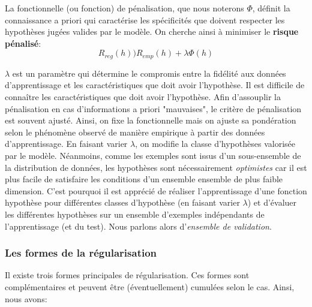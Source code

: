 \noindent La fonctionnelle (ou fonction) de pénalisation, que nous noterons $\Phi$, définit la connaissance a priori qui caractérise les spécificités que doivent respecter les hypothèses jugées valides par le modèle. On cherche ainsi à minimiser le \textbf{risque pénalisé}:
$$R_{reg}(h) ) R_{emp}(h) + \lambda \Phi(h)$$

\noindent $\lambda$ est un paramètre qui détermine le compromis entre la fidélité aux données d'apprentissage et les caractéristiques que doit avoir l'hypothèse. Il est difficile de connaître les caractéristiques que doit avoir l'hypothèse. Afin d'assouplir la pénalisation en cas d'informations a priori "mauvaises", le critère de pénalisation est souvent ajusté. Ainsi, on fixe la fonctionnelle mais on ajuste sa pondération selon le phénomène observé de manière empirique à partir des données d'apprentissage. En faisant varier $\lambda$, on modifie la classe d'hypothèses valorisée par le modèle. Néanmoins, comme les exemples sont issus d'un sous-ensemble de la distribution de données, les hypothèses sont nécessairement \textit{optimistes} car il est plus facile de satisfaire les conditions d'un ensemble ensemble de plus faible dimension. C'est pourquoi il est apprécié de réaliser l'apprentissage d'une fonction hypothèse pour différentes classes d'hypothèse (en faisant varier $\lambda$) et d'évaluer les différentes hypothèses sur un ensemble d'exemples indépendants de l'apprentissage (et du test). Nous parlons alors d'\textit{ensemble de validation}.

\subsubsection{Les formes de la régularisation}

\noindent Il existe trois formes principales de régularisation. Ces formes sont complémentaires et peuvent être (éventuellement) cumulées selon le cas. Ainsi, nous avons:

